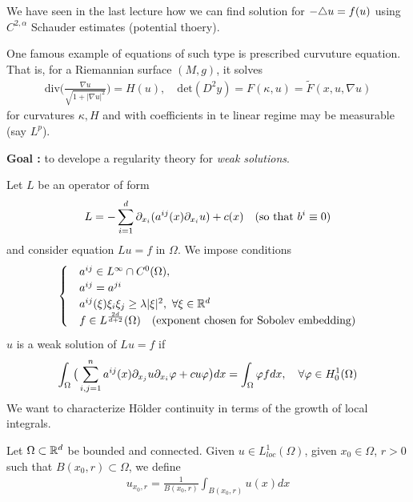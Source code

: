 \documentclass[12pt,a4paper]{article}
\begin{document}
We have seen in the last lecture how we can find solution for $-\triangle u = f(u)$ using $C^{2, \alpha}$ Schauder estimates (potential thoery).

\quad One famous example of equations of such type is prescribed curvuture equation. That is, for a Riemannian surface $(M,g)$, it solves
\begin{align*}
\text{div}\big( \frac{\nabla u}{\sqrt{1 + |\nabla u|^2}} \big) = H(u), \quad \text{det}(D^2 y) = F(\kappa, u) = \tilde{F}(x, u, \nabla u)
\end{align*}
for curvatures $\kappa, H$ and with coefficients in te linear regime may be measurable (say $L^p$).
\s

\textbf{Goal :} to develope a regularity theory for \emph{weak solutions}. 
\s

Let $L$ be an operator of form
\begin{align*}
L = -\sum_{i=1}^d \partial_{x_i}(a^{ij}(x) \partial_{x_i} u) + c(x) \quad (\text{so that } b^i \equiv 0)
\end{align*}
and consider equation $Lu = f$ in $\Omega$. We impose conditions
\begin{align*}
\begin{cases}
& a^{ij} \in L^{\infty} \cap C^0(\Omega),\\
& a^{ij}= a^{ji} \\
& a^{ij}(\xi)\xi_i \xi_j \geq \lambda |\xi|^2, \,\, \forall \xi \in \mathbb{R}^d \\
& f\in L^{\frac{2d}{d+2}}(\Omega) \quad (\text{exponent chosen for Sobolev embedding})
\end{cases}
\end{align*}
$u$ is a weak solution of $Lu =f$ if
\begin{align*}
\int_{\Omega} \big( \sum_{i,j=1}^n a^{ij}(x) \partial_{x_j} u \partial_{x_i} \varphi + cu\varphi \big) dx = \int_{\Omega} \varphi f dx, \quad \forall \varphi \in H_0^1(\Omega)
\end{align*}
We want to characterize H\"older continuity in terms of the growth of local integrals.
\s

Let $\Omega \subset \mathbb{R}^d$ be bounded and connected. Given $u\in L^1_{loc}(\Omega)$, given $x_0 \in \Omega$, $r>0$ such that $B(x_0, r) \subset \Omega$, we define
\begin{align*}
u_{x_0, r} = \frac{1}{B(x_0, r)}\int_{B(x_0, r)} u(x) dx
\end{align*}
\s
\end{document}
